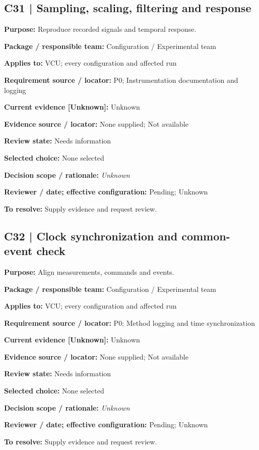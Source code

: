 \documentclass[11pt]{article}
\begin{document}
\begin{minipage}{\textwidth}\small\setlength{\parskip}{2pt}
\subsection*{C31 | Sampling, scaling, filtering and response}
\textbf{Purpose:} Reproduce recorded signals and temporal response.\par
\textbf{Package / responsible team:} Configuration / Experimental team\par
\textbf{Applies to:} VCU; every configuration and affected run\par
\textbf{Requirement source / locator:} P0; Instrumentation documentation and logging\par
\textbf{Current evidence [Unknown]:} Unknown\par
\textbf{Evidence source / locator:} None supplied; Not available\par
\textbf{Review state:} Needs information\par
\textbf{Selected choice:} None selected\par
\textbf{Decision scope / rationale:} \textit{Unknown}\par
\textbf{Reviewer / date; effective configuration:} Pending; Unknown\par
\textbf{To resolve:} Supply evidence and request review.\par
\end{minipage}\par\vspace{5pt}
\begin{minipage}{\textwidth}\small\setlength{\parskip}{2pt}
\subsection*{C32 | Clock synchronization and common-event check}
\textbf{Purpose:} Align measurements, commands and events.\par
\textbf{Package / responsible team:} Configuration / Experimental team\par
\textbf{Applies to:} VCU; every configuration and affected run\par
\textbf{Requirement source / locator:} P0; Method logging and time synchronization\par
\textbf{Current evidence [Unknown]:} Unknown\par
\textbf{Evidence source / locator:} None supplied; Not available\par
\textbf{Review state:} Needs information\par
\textbf{Selected choice:} None selected\par
\textbf{Decision scope / rationale:} \textit{Unknown}\par
\textbf{Reviewer / date; effective configuration:} Pending; Unknown\par
\textbf{To resolve:} Supply evidence and request review.\par
\end{minipage}\par\vspace{5pt}
\end{document}
